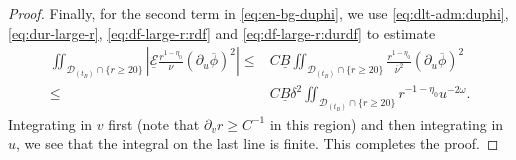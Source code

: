 \documentclass[10pt, reqno]{amsart}
\theoremstyle{definition}
\theoremstyle{remark}
\theoremstyle{conjecture}
\numberwithin{equation}{section}
\newcommand{\set}[1]{\{#1\}}
\newcommand{\rd}{\partial}
\newcommand{\0}{\emptyset}
\newcommand{\dlt}{\delta}
\newcommand{\omg}{\omega}
\newcommand{\calD}{\mathcal D}
\newcommand{\calE}{\mathcal E}
\newcommand{\dur}{\nu}
\newcommand{\phibg}{\overline{\phi}}				%
\newcommand{\durbg}{\overline{\dur}}				%
\newcommand{\Abs}[1]{\left\vert #1 \right\vert}
\begin{document}
\begin{proof}
Finally, for the second term in \eqref{eq:en-bg-duphi}, we use \eqref{eq:dlt-adm:duphi}, \eqref{eq:dur-large-r}, \eqref{eq:df-large-r:rdf} and \eqref{eq:df-large-r:durdf} to estimate
\begin{align*}
\iint_{\calD_{(t_{B})} \cap \set{r \geq 20}}
\Abs{ \underline{\calE} \frac{r^{1-\eta_{0}}}{\dur}(\rd_{u} \phibg)^{2}} 
\leq & C \underline{B} \iint_{\calD_{(t_{B})} \cap \set{r \geq 20}} \frac{r^{1-\eta_{0}}}{\durbg^{2}} (\rd_{u} \phibg)^{2} \\
\leq & C \underline{B} \dlt^{2} \iint_{\calD_{(t_{B})} \cap \set{r \geq 20}} r^{-1-\eta_{0}} u^{-2 \omg}.
\end{align*}
Integrating in $v$ first (note that $\rd_{v} r \geq C^{-1}$ in this region) and then integrating in $u$, we see that the integral on the last line is finite. This completes the proof. \qedhere
\end{proof}
\end{document}
